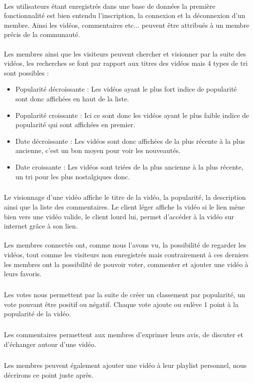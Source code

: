 \documentclass{article}
\begin{document}
\paragraph{}Les utilisateurs étant enregistrés dans une base de données la première fonctionnalité est bien entendu l'inscription, la connexion et la déconnexion d'un membre. Ainsi les vidéos, commentaires etc... peuvent être attribués à un membre précis de la communauté.

\paragraph{}Les membres ainsi que les visiteurs peuvent chercher et visionner par la suite des vidéos, les recherches se font par rapport aux titres des vidéos mais 4 types de tri sont possibles :
	\begin{itemize}
	\item Popularité décroissante : Les vidéos ayant le plus fort indice de popularité sont donc affichées en haut de la liste.
	\item Popularité croissante : Ici ce sont donc les vidéos ayant le plus faible indice de popularité qui sont affichées en premier.
	\item Date décroissante : Les vidéos sont donc affichées de la plus récente à la plus ancienne, c'est un bon moyen pour voir les nouveautés.
	\item Date croissante : Les vidéos sont triées de la plus ancienne à la plus récente, un tri pour les plus nostalgiques donc.
	\end{itemize}
\subparagraph{}Le visionnage d'une vidéo affiche le titre de la vidéo, la popularité, la description ainsi que la liste des commentaires. Le client léger affiche la vidéo si le lien mène bien vers une vidéo valide, le client lourd lui, permet d'accéder à la vidéo sur internet grâce à son lien.

\paragraph{}Les membres connectés ont, comme nous l'avons vu, la possibilité de regarder les vidéos, tout comme les visiteurs non enregistrés mais contrairement à ces derniers les membres ont la possibilité de pouvoir voter, commenter et ajouter une vidéo à leurs favoris.
\subparagraph{}Les votes nous permettent par la suite de créer un classement par popularité, un vote pouvant être positif ou négatif. Chaque vote ajoute ou enlève 1 point à la popularité de la vidéo.
\subparagraph{}Les commentaires permettent aux membres d'exprimer leurs avis, de discuter et d'échanger autour d'une vidéo.
\subparagraph{}Les membres peuvent également ajouter une vidéo à leur playlist personnel, nous décrirons ce point juste après.
\end{document}
